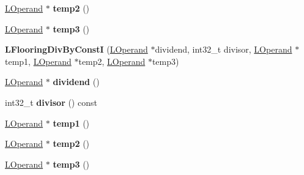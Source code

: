 \begin{DoxyCompactItemize}
\item 
\hyperlink{classv8_1_1internal_1_1_l_operand}{L\+Operand} $\ast$ {\bfseries temp2} ()\hypertarget{classv8_1_1internal_1_1_l_flooring_div_by_const_i_a8e376f93dd8ed6f99cdb3a868d5ab002}{}\label{classv8_1_1internal_1_1_l_flooring_div_by_const_i_a8e376f93dd8ed6f99cdb3a868d5ab002}

\item 
\hyperlink{classv8_1_1internal_1_1_l_operand}{L\+Operand} $\ast$ {\bfseries temp3} ()\hypertarget{classv8_1_1internal_1_1_l_flooring_div_by_const_i_a543b3996a7541e9fb40b9ee3b9fcedef}{}\label{classv8_1_1internal_1_1_l_flooring_div_by_const_i_a543b3996a7541e9fb40b9ee3b9fcedef}

\item 
{\bfseries L\+Flooring\+Div\+By\+ConstI} (\hyperlink{classv8_1_1internal_1_1_l_operand}{L\+Operand} $\ast$dividend, int32\+\_\+t divisor, \hyperlink{classv8_1_1internal_1_1_l_operand}{L\+Operand} $\ast$temp1, \hyperlink{classv8_1_1internal_1_1_l_operand}{L\+Operand} $\ast$temp2, \hyperlink{classv8_1_1internal_1_1_l_operand}{L\+Operand} $\ast$temp3)\hypertarget{classv8_1_1internal_1_1_l_flooring_div_by_const_i_a4bad6bad2a160ec580ee294ea5f5f221}{}\label{classv8_1_1internal_1_1_l_flooring_div_by_const_i_a4bad6bad2a160ec580ee294ea5f5f221}

\item 
\hyperlink{classv8_1_1internal_1_1_l_operand}{L\+Operand} $\ast$ {\bfseries dividend} ()\hypertarget{classv8_1_1internal_1_1_l_flooring_div_by_const_i_afd6eec483f06b84f2130f69d1bdb0663}{}\label{classv8_1_1internal_1_1_l_flooring_div_by_const_i_afd6eec483f06b84f2130f69d1bdb0663}

\item 
int32\+\_\+t {\bfseries divisor} () const \hypertarget{classv8_1_1internal_1_1_l_flooring_div_by_const_i_af9d8b07c5bf6feee1c070b62089c5bd2}{}\label{classv8_1_1internal_1_1_l_flooring_div_by_const_i_af9d8b07c5bf6feee1c070b62089c5bd2}

\item 
\hyperlink{classv8_1_1internal_1_1_l_operand}{L\+Operand} $\ast$ {\bfseries temp1} ()\hypertarget{classv8_1_1internal_1_1_l_flooring_div_by_const_i_ad723ce4b2d2a5fc051973689dc5f0fa0}{}\label{classv8_1_1internal_1_1_l_flooring_div_by_const_i_ad723ce4b2d2a5fc051973689dc5f0fa0}

\item 
\hyperlink{classv8_1_1internal_1_1_l_operand}{L\+Operand} $\ast$ {\bfseries temp2} ()\hypertarget{classv8_1_1internal_1_1_l_flooring_div_by_const_i_a8e376f93dd8ed6f99cdb3a868d5ab002}{}\label{classv8_1_1internal_1_1_l_flooring_div_by_const_i_a8e376f93dd8ed6f99cdb3a868d5ab002}

\item 
\hyperlink{classv8_1_1internal_1_1_l_operand}{L\+Operand} $\ast$ {\bfseries temp3} ()\hypertarget{classv8_1_1internal_1_1_l_flooring_div_by_const_i_a543b3996a7541e9fb40b9ee3b9fcedef}{}\label{classv8_1_1internal_1_1_l_flooring_div_by_const_i_a543b3996a7541e9fb40b9ee3b9fcedef}

\end{DoxyCompactItemize}

